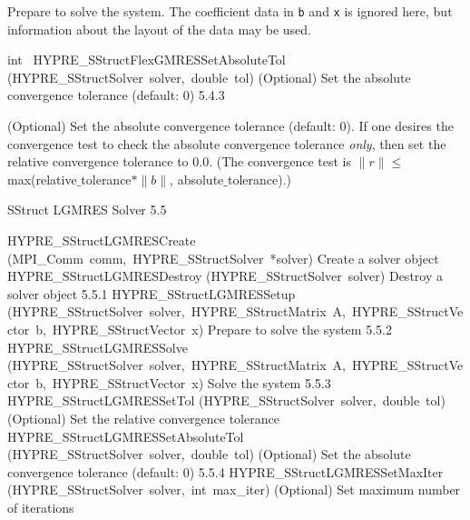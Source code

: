 \documentclass{article}
\begin{document}
\begin{cxxentry}
\begin{cxxentry}
\begin{cxxfunction}
\begin{cxxdoc}
Prepare to solve the system.  The coefficient data in {\tt b} and {\tt x} is
ignored here, but information about the layout of the data may be used.
\end{cxxdoc}
\end{cxxfunction}
\begin{cxxfunction}
{int\ }
        {HYPRE\_SStructFlexGMRESSetAbsoluteTol}
        {(HYPRE\_SStructSolver\ solver,\ double\ tol)}
        {
(Optional) Set the absolute convergence tolerance (default: 0)}
        {5.4.3}
\begin{cxxdoc}

(Optional) Set the absolute convergence tolerance (default: 0).
If one desires
the convergence test to check the absolute convergence tolerance {\it only}, then
set the relative convergence tolerance to 0.0.  (The convergence test is 
$\|r\| \leq$ max(relative$\_$tolerance$\ast \|b\|$, absolute$\_$tolerance).)
\end{cxxdoc}
\end{cxxfunction}
\end{cxxentry}
\begin{cxxentry}
{}
        {SStruct LGMRES Solver}
        {}
        {
}
        {5.5}
\begin{cxxnames}
        {HYPRE\_SStructLGMRESCreate}
        {(MPI\_Comm\ comm,\ HYPRE\_SStructSolver\ *solver)}
        {
Create a solver object}
        {}
\label{cxx.5.5.5}
        {HYPRE\_SStructLGMRESDestroy}
        {(HYPRE\_SStructSolver\ solver)}
        {
Destroy a solver object}
        {5.5.1}
        {HYPRE\_SStructLGMRESSetup}
        {(HYPRE\_SStructSolver\ solver,\ HYPRE\_SStructMatrix\ A,\ HYPRE\_SStructVector\ b,\ HYPRE\_SStructVector\ x)}
        {
Prepare to solve the system}
        {5.5.2}
        {HYPRE\_SStructLGMRESSolve}
        {(HYPRE\_SStructSolver\ solver,\ HYPRE\_SStructMatrix\ A,\ HYPRE\_SStructVector\ b,\ HYPRE\_SStructVector\ x)}
        {
Solve the system}
        {5.5.3}
        {HYPRE\_SStructLGMRESSetTol}
        {(HYPRE\_SStructSolver\ solver,\ double\ tol)}
        {
(Optional) Set the relative convergence tolerance}
        {}
\label{cxx.5.5.6}
        {HYPRE\_SStructLGMRESSetAbsoluteTol}
        {(HYPRE\_SStructSolver\ solver,\ double\ tol)}
        {
(Optional) Set the absolute convergence tolerance  (default: 0)}
        {5.5.4}
        {HYPRE\_SStructLGMRESSetMaxIter}
        {(HYPRE\_SStructSolver\ solver,\ int\ max\_iter)}
        {
(Optional) Set maximum number of iterations}

\end{cxxnames}
\end{cxxentry}
\end{cxxentry}
\end{document}

